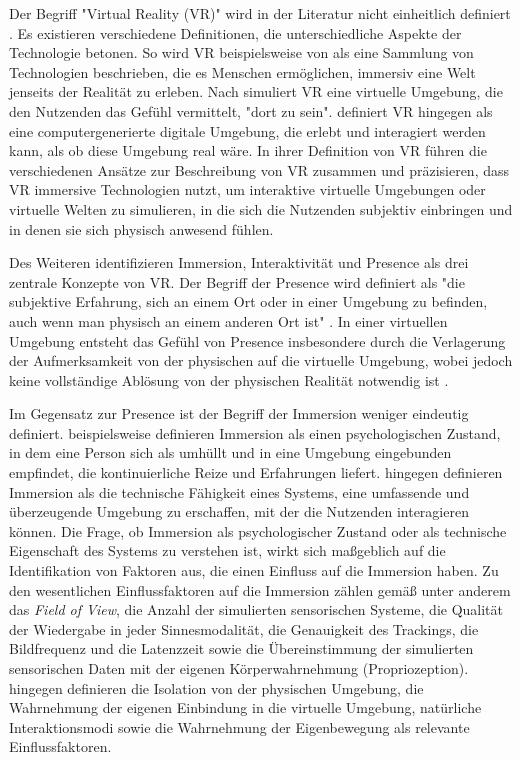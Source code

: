 Der Begriff "Virtual Reality (VR)" wird in der Literatur nicht einheitlich definiert \citep{wohlgenannt_virtual_2020}. Es existieren verschiedene Definitionen, die unterschiedliche Aspekte der Technologie betonen. So wird VR beispielsweise von \citet{berg_industry_2017} als eine Sammlung von Technologien beschrieben, die es Menschen ermöglichen, immersiv eine Welt jenseits der Realität zu erleben. 
Nach \citet{4287241} simuliert VR eine virtuelle Umgebung, die den Nutzenden das Gefühl vermittelt, "dort zu sein". \citet{jerald_vr_2016} definiert VR hingegen als eine computergenerierte digitale Umgebung, die erlebt und interagiert werden kann, als ob diese Umgebung real wäre. In ihrer Definition von VR führen \citet{wohlgenannt_virtual_2020} die verschiedenen Ansätze zur Beschreibung von VR zusammen und präzisieren, dass VR immersive Technologien nutzt, um interaktive virtuelle Umgebungen oder virtuelle Welten zu simulieren, in die sich die Nutzenden subjektiv einbringen und in denen sie sich physisch anwesend fühlen.

Des Weiteren identifizieren \citet{walsh_virtual_2002} Immersion, Interaktivität und Presence als drei zentrale Konzepte von VR. Der Begriff der Presence wird definiert als "die subjektive Erfahrung, sich an einem Ort oder in einer Umgebung zu befinden, auch wenn man physisch an einem anderen Ort ist" \citep{witmer_measuring_1998}. In einer virtuellen Umgebung entsteht das Gefühl von Presence insbesondere durch die Verlagerung der Aufmerksamkeit von der physischen auf die virtuelle Umgebung, wobei jedoch keine vollständige Ablösung von der physischen Realität notwendig ist \citep{witmer_measuring_1998}. 

Im Gegensatz zur Presence ist der Begriff der Immersion weniger eindeutig definiert. \citet{witmer_measuring_1998} beispielsweise definieren Immersion als einen psychologischen Zustand, in dem eine Person sich als umhüllt und in eine Umgebung eingebunden empfindet, die kontinuierliche Reize und Erfahrungen liefert. \citet{sanchez-vives_presence_2005} hingegen definieren Immersion als die technische Fähigkeit eines Systems, eine umfassende und überzeugende Umgebung zu erschaffen, mit der die Nutzenden interagieren können. 
Die Frage, ob Immersion als psychologischer Zustand oder als technische Eigenschaft des Systems zu verstehen ist, wirkt sich maßgeblich auf die Identifikation von Faktoren aus, die einen Einfluss auf die Immersion haben. 
Zu den wesentlichen Einflussfaktoren auf die Immersion zählen gemäß  \citet{sanchez-vives_presence_2005} unter anderem das \textit{Field of View}, die Anzahl der simulierten sensorischen Systeme, die Qualität der Wiedergabe in jeder Sinnesmodalität, die Genauigkeit des Trackings, die Bildfrequenz und die Latenzzeit sowie die Übereinstimmung der simulierten sensorischen Daten mit der eigenen Körperwahrnehmung (Propriozeption). \citet{witmer_measuring_1998} hingegen definieren die Isolation von der physischen Umgebung, die Wahrnehmung der eigenen Einbindung in die virtuelle Umgebung, natürliche Interaktionsmodi sowie die Wahrnehmung der Eigenbewegung als relevante Einflussfaktoren. 

